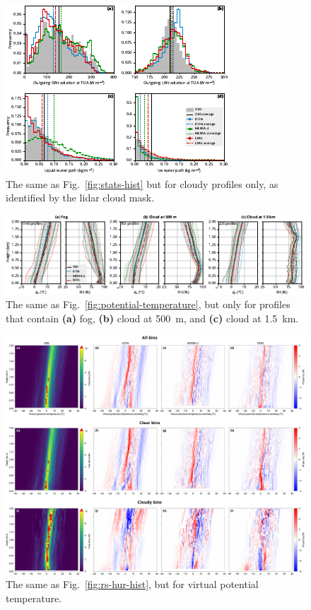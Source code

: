 \documentclass[draft,jgrga]{agutexSI2019}
\begin{document}
\begin{figure}[p!]
\includegraphics[width=\textwidth]{img/stats_hist_cloudy.pdf}
\caption{
The same as Fig.~\ref{fig:stats-hist} but for cloudy profiles only, as identified by the lidar cloud mask.
}
\label{fig:stats-hist-cloudy}
\end{figure}

\begin{figure}[t]
\centerline{
\includegraphics[width=1.2\textwidth]{img/rs_thetav_hur_cloud.pdf}
}
\caption{
The same as Fig.~\ref{fig:potential-temperature}, but only for profiles that contain \textbf{(a)} fog, \textbf{(b)} cloud at 500~m, and \textbf{(c)} cloud at 1.5~km.
}
\label{fig:rs-thetav-hur-cloud}
\end{figure}

\begin{figure}[t]
\centerline{
\includegraphics[width=1.2\textwidth]{img/rs_thetav_hist.png}
}
\caption{
The same as Fig.~\ref{fig:rs-hur-hist}, but for virtual potential temperature.
}
\label{fig:rs-thetav-hist}
\end{figure}
\end{document}
